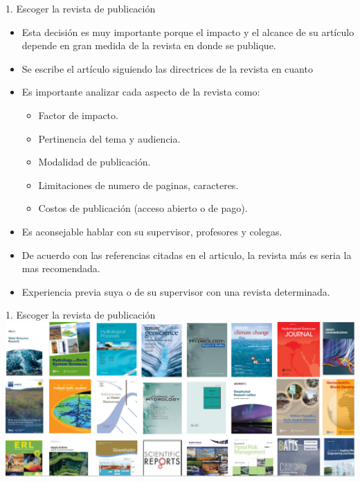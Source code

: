 \documentclass[
10pt,
aspectratio=169,
]{beamer}
\begin{document}
\begin{frame}{1. Escoger la revista de publicación}
\begin{itemize}
\item Esta decisi\'on es muy importante porque el \alert{impacto} y el \alert{alcance} de su art\'iculo depende en gran medida de la revista en donde se publique. 
\item Se escribe el art\'iculo siguiendo las directrices de la revista en cuanto
\item Es importante analizar cada aspecto de la revista como:
\begin{itemize}
\item Factor de impacto.
\item Pertinencia del tema y audiencia.
\item Modalidad de publicaci\'on.
\item Limitaciones de numero de paginas, caracteres.
\item Costos de publicación (acceso abierto o de pago).
\end{itemize}
\item Es aconsejable hablar con su supervisor, profesores y colegas. 
\item De acuerdo con las referencias citadas en el articulo, la revista m\'as es seria la mas recomendada.
\item Experiencia previa suya o de su supervisor con una revista determinada.
\end{itemize}
\end{frame}


\begin{frame}{1. Escoger la revista de publicación}
\centering
\includegraphics[width=\textwidth]{fi2.png}
\end{frame}
\end{document}
